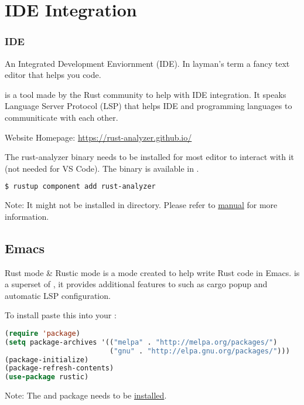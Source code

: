 \documentclass{beamer}
\begin{document}
\section{IDE Integration}
\begin{frame}[fragile]
  \frametitle{IDE}
  An Integrated Development Enviornment (IDE). In layman's term a fancy text editor that helps you code.

   is a tool made by the Rust community to help with IDE integration. It speaks Language Server Protocol (LSP) that helps IDE and programming languages to communiticate with each other.

  Website Homepage: \url{https://rust-analyzer.github.io/}

  The rust-analyzer binary needs to be installed for most editor to interact with it (not needed for VS Code). The binary is available in .
\begin{lstlisting}[language=bash]
$ rustup component add rust-analyzer
\end{lstlisting}

  \alert{Note:} It might not be installed in  directory. Please refer to  \href{https://rust-analyzer.github.io/manual.html}{manual} for more information.
\end{frame}

\subsection{Emacs}

\begin{frame}[fragile]{Rust mode \& Rustic mode}
   is a mode created to help write Rust code in Emacs.  is a superset of , it provides additional features to  such as cargo popup and automatic LSP configuration.

  To install paste this into your :
\begin{lstlisting}[language=Lisp]
(require 'package)
(setq package-archives '(("melpa" . "http://melpa.org/packages/")
                         ("gnu" . "http://elpa.gnu.org/packages/")))
(package-initialize)
(package-refresh-contents)
(use-package rustic)
\end{lstlisting}

  \alert{Note:} The  and  package needs to be \href{https://www.emacswiki.org/emacs/InstallingPackages}{installed}.
\end{frame}
\end{document}
